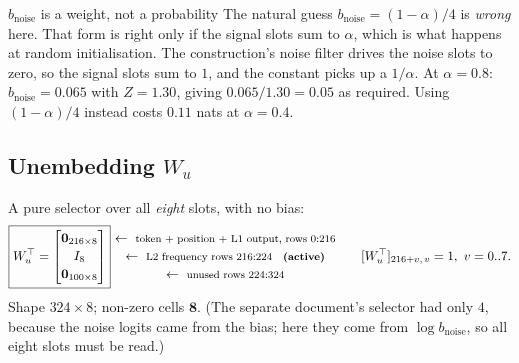 \documentclass[11pt]{article}
\newcommand{\rowlab}[1]{\ \leftarrow\ \text{\footnotesize #1}}
\begin{document}
\begin{warningbox}{$b_{\mathrm{noise}}$ is a weight, not a probability}
The natural guess $b_{\mathrm{noise}}=(1-\alpha)/4$ is \emph{wrong} here. That form is right only
if the signal slots sum to $\alpha$, which is what happens at random initialisation. The
construction's noise filter drives the noise slots to zero, so the signal slots sum to $1$, and
the constant picks up a $1/\alpha$. At $\alpha=0.8$: $b_{\mathrm{noise}}=0.065$ with
$Z=1.30$, giving $0.065/1.30=0.05$ as required. Using $(1-\alpha)/4$ instead costs $0.11$ nats at
$\alpha=0.4$.
\end{warningbox}

\subsection{Unembedding $W_u$}
A pure selector over all \emph{eight} slots, with no bias:
\begin{equation}
\boxed{
W_u^\top=
\begin{bmatrix}
\bm{0}_{216\times8}\\[2pt]
I_8\\[2pt]
\bm{0}_{100\times8}
\end{bmatrix}}
\begin{matrix}
\rowlab{token $+$ position $+$ L1 output, rows $0{:}216$}\\[2pt]
\rowlab{L2 frequency rows $216{:}224$ \ \ \textbf{(active)}}\\[2pt]
\rowlab{unused rows $224{:}324$}
\end{matrix}
\qquad
[W_u^\top]_{216+v,\,v}=1,\ v=0..7 .
\end{equation}
Shape $324\times8$; non-zero cells $\bm{8}$. (The separate document's selector had only $4$,
because the noise logits came from the bias; here they come from $\log b_{\mathrm{noise}}$, so all
eight slots must be read.)
\end{document}
